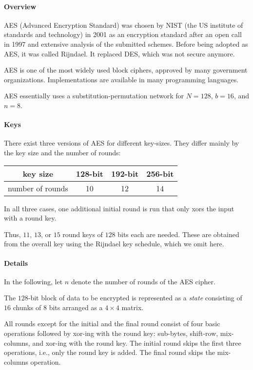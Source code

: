\paragraph{Overview}
AES (Advanced Encryption Standard) was chosen by NIST (the US institute of standards and technology) in 2001 as an encryption standard after an open call in 1997 and extensive analysis of the submitted schemes.
Before being adopted as AES, it was called Rijndael.
It replaced DES, which was not secure anymore.

AES is one of the most widely used block ciphers, approved by many government organizations.
Implementations are available in many programming languages.

AES essentially uses a substitution-permutation network for $N=128$, $b=16$, and $n=8$.

\paragraph{Keys}
There exist three versions of AES for different key-sizes.
They differ mainly by the key size and the number of rounds:
\begin{center}
  \begin{tabular}{|c|c|c|c|}
  	\hline key size & 128-bit & 192-bit & 256-bit \\ 
  	\hline number of rounds & 10 & 12 & 14 \\ 
  	\hline
  \end{tabular}
\end{center}
In all three cases, one additional initial round is run that only xors the input with a round key.

Thus, $11$, $13$, or $15$ round keys of $128$ bits each are needed.
These are obtained from the overall key using the Rijndael key schedule, which we omit here.

\paragraph{Details}
In the following, let $n$ denote the number of rounds of the AES cipher.

The $128$-bit block of data to be encrypted is represented as a \emph{state} consisting of $16$ chunks of $8$ bits arranged as a $4\times 4$ matrix.

All rounds except for the initial and the final round consist of four basic operations followed by xor-ing with the round key: sub-bytes, shift-row, mix-columns, and xor-ing with the round key.
The initial round skips the first three operations, i.e., only the round key is added.
The final round skips the mix-columns operation.

